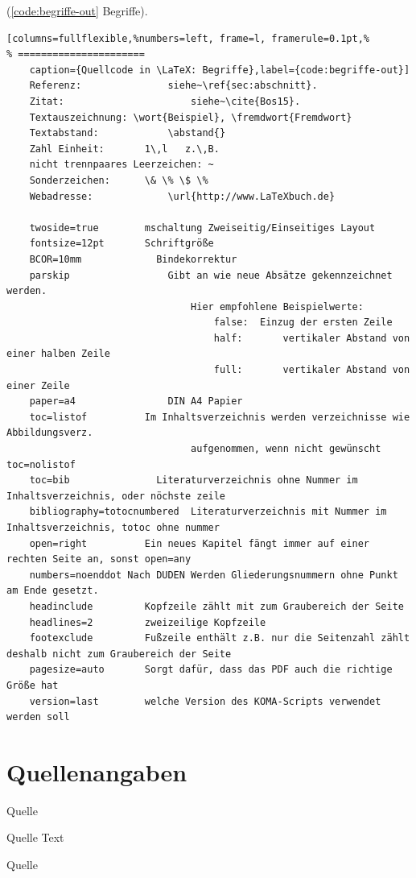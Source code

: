 (\autoref{code:begriffe-out} Begriffe).
\lstset{language=[LaTeX]TeX} %
\begin{lstlisting}[columns=fullflexible,%numbers=left, frame=l, framerule=0.1pt,%
% ======================
	caption={Quellcode in \LaTeX: Begriffe},label={code:begriffe-out}]
	Referenz: 				siehe~\ref{sec:abschnitt}.
	Zitat: 						siehe~\cite{Bos15}.
	Textauszeichnung: \wort{Beispiel}, \fremdwort{Fremdwort}
	Textabstand: 			\abstand{}
	Zahl Einheit: 		1\,l   z.\,B.
	nicht trennpaares Leerzeichen: ~
	Sonderzeichen: 		\& \% \$ \%
	Webadresse:				\url{http://www.LaTeXbuch.de}

	twoside=true		mschaltung Zweiseitig/Einseitiges Layout
	fontsize=12pt		Schriftgröße
	BCOR=10mm			  Bindekorrektur
	parskip					Gibt an wie neue Absätze gekennzeichnet werden.
								Hier empfohlene Beispielwerte:
									false:	Einzug der ersten Zeile
									half:		vertikaler Abstand von einer halben Zeile
									full:		vertikaler Abstand von einer Zeile
	paper=a4				DIN A4 Papier
	toc=listof			Im Inhaltsverzeichnis werden verzeichnisse wie Abbildungsverz.
								aufgenommen, wenn nicht gewünscht toc=nolistof
	toc=bib				  Literaturverzeichnis ohne Nummer im Inhaltsverzeichnis, oder nöchste zeile
	bibliography=totocnumbered	Literaturverzeichnis mit Nummer im Inhaltsverzeichnis, totoc ohne nummer
	open=right			Ein neues Kapitel fängt immer auf einer rechten Seite an, sonst open=any
	numbers=noenddot Nach DUDEN Werden Gliederungsnummern ohne Punkt am Ende gesetzt.
	headinclude			Kopfzeile zählt mit zum Graubereich der Seite
	headlines=2			zweizeilige Kopfzeile
	footexclude			Fußzeile enthält z.B. nur die Seitenzahl zählt deshalb nicht zum Graubereich der Seite
	pagesize=auto		Sorgt dafür, dass das PDF auch die richtige Größe hat
	version=last		welche Version des KOMA-Scripts verwendet werden soll
\end{lstlisting}

\newpage

\section{Quellenangaben}

Quelle \textcite{schlosser_latex:2016}

Quelle Text

Quelle \cite{schlosser_latex:2016}
